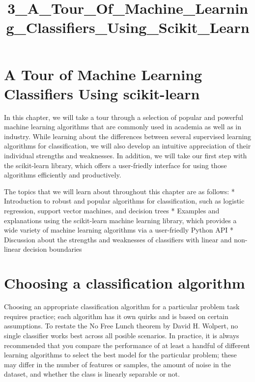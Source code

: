\documentclass[11pt]{article}
\title{3\_A\_Tour\_Of\_Machine\_Learning\_Classifiers\_Using\_Scikit\_Learn}
\begin{document}
    
    
    \maketitle
    
    

    
    \section{A Tour of Machine Learning Classifiers Using
scikit-learn}\label{a-tour-of-machine-learning-classifiers-using-scikit-learn}

    In this chapter, we will take a tour through a selection of popular and
powerful machine learning algorithms that are commonly used in academia
as well as in industry. While learning about the differences between
several supervised learning algorithms for classification, we will also
develop an intuitive appreciation of their individual strengths and
weaknesses. In addition, we will take our first step with the
scikit-learn library, which offers a user-friedly interface for using
those algorithms efficiently and productively.

The topics that we will learn about throughout this chapter are as
follows: * Introduction to robust and popular algorithms for
classification, such as logistic regression, support vector machines,
and decision trees * Examples and explanations using the scikit-learn
machine learning library, which provides a wide variety of machine
learning algorithms via a user-friedly Python API * Discussion about the
strengths and weaknesses of classifiers with linear and non-linear
decision boundaries

    \section{Choosing a classification
algorithm}\label{choosing-a-classification-algorithm}

    Choosing an appropriate classification algorithm for a particular
problem task requires practice; each algorithm has it own quirks and is
based on certain assumptions. To restate the No Free Lunch theorem by
David H. Wolpert, no single classifier works best across all posible
scenarios. In practice, it is always recommended that you compare the
performance of at least a handful of different learning algorithms to
select the best model for the particular problem; these may differ in
the number of features or samples, the amount of noise in the dataset,
and whether the class is linearly separable or not.
\end{document}
